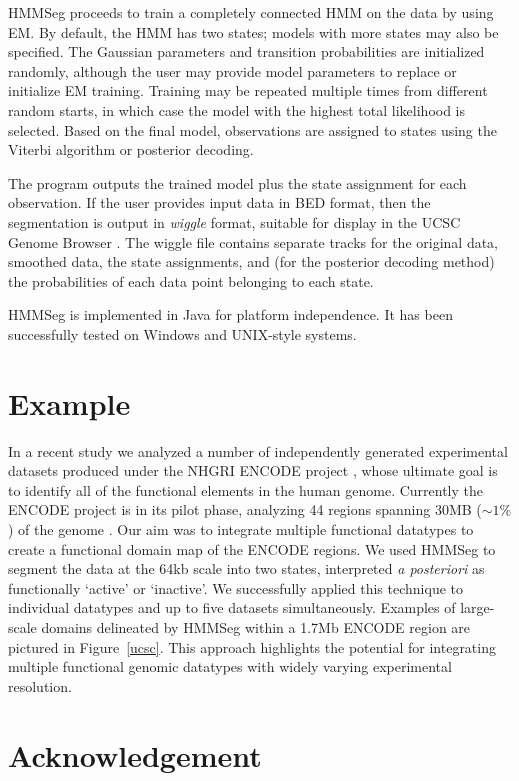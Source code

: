 \documentclass{bioinfo}
\begin{document}
HMMSeg proceeds to train a completely connected HMM on the data by using
EM.  By default, the HMM has two states; models with more states may
also be specified.  The Gaussian parameters and transition
probabilities are initialized randomly, although the user may provide
model parameters to replace or initialize EM training.  Training may
be repeated multiple times from different random starts, in which case
the model with the highest total likelihood is 
selected.  Based on the final model, observations are assigned to
states using the Viterbi algorithm or posterior decoding.

The program outputs the trained model plus the state assignment for
each observation.  If the user provides input data in BED format, then
the segmentation is output in {\it wiggle} format, suitable for
display in the UCSC Genome Browser \citep{kent:human}.  The wiggle
file contains separate tracks for the original data, smoothed data,
the state assignments, and (for the posterior decoding method) the
probabilities of each data point belonging to each state.

HMMSeg is implemented in Java for platform independence.  It has been
successfully tested on Windows and UNIX-style systems.

\section{Example}

In a recent study \citep{thurman:identification} we analyzed a number
of independently generated experimental datasets produced under the
NHGRI ENCODE project \citep{encode:encode}, whose ultimate goal is to
identify all of the functional elements in the human genome.
Currently the ENCODE project is in its pilot phase, analyzing 44
regions spanning 30MB ($\sim 1\%$) of the genome
\citep{encode:encode2}.  Our aim was to integrate multiple functional
datatypes to create a functional domain map of the ENCODE regions.  We
used HMMSeg to segment the data at the 64kb scale into two states,
interpreted {\it a posteriori} as functionally `active' or `inactive'.
We successfully applied this technique to individual datatypes and up
to five datasets simultaneously. Examples of large-scale domains
delineated by HMMSeg within a 1.7Mb ENCODE region are pictured in
Figure~\ref{ucsc}.  This approach highlights the potential for
integrating multiple functional genomic datatypes with widely varying
experimental resolution.

\section*{Acknowledgement}
\end{document}
